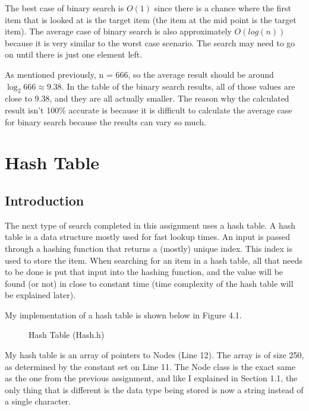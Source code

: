 \documentclass[letterpaper, 10pt]{article}
\begin{document}
\noindent
The best case of binary search is $O(1)$ since there is a chance where the first item that is looked at is the target item (the item at the mid point is the target item). The average case of binary search is also approximately $O(log(n))$ because it is very similar to the worst case scenario. The search may need to go on until there is just one element left. 

\vspace{1em}

\noindent
As mentioned previously, n = 666, so the average result should be around $\log_2 666 \approx 9.38$. In the table of the binary search results, all of those values are close to 9.38, and they are all actually smaller. The reason why the calculated result isn't 100\% accurate is because it is difficult to calculate the average case for binary search because the results can vary so much.

\section{Hash Table}
\setcounter{figure}{0} %

\subsection{Introduction}
\noindent
The next type of search completed in this assignment uses a hash table. A hash table is a data structure mostly used for fast lookup times. An input is passed through a hashing function that returns a (mostly) unique index. This index is used to store the item. When searching for an item in a hash table, all that needs to be done is put that input into the hashing function, and the value will be found (or not) in close to constant time (time complexity of the hash table will be explained later).

\vspace{1em}

\noindent
My implementation of a hash table is shown below in Figure 4.1.

\begin{figure}[H]
  \centering
  
  \caption{Hash Table (Hash.h)}
  \label{fig:figure4.1}
\end{figure}

\noindent
My hash table is an array of pointers to Nodes (Line 12). The array is of size 250, as determined by the constant set on Line 11. The Node class is the exact same as the one from the previous assignment, and like I explained in Section 1.1, the only thing that is different is the data type being stored is now a string instead of a single character.
\end{document}

